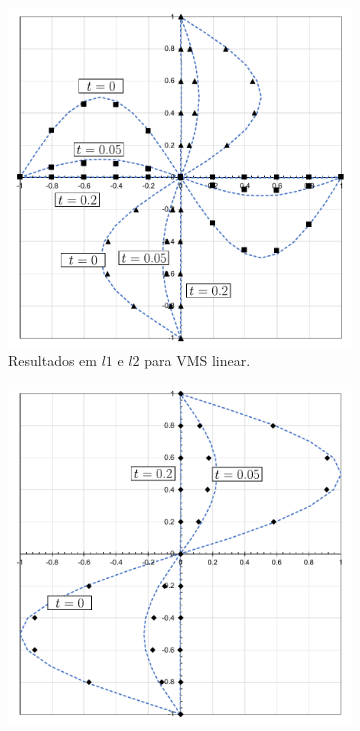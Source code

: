 \begin{figure}[h]
    \centering
    \caption{Resultados obtidos para a simulação de TGV.}
    \begin{subfigure}{0.42\textwidth}
    \includegraphics[width=\linewidth]{Figuras/taylor-green/VMS-Lin.pdf}
    \caption{Resultados em $l1$ e $l2$ para VMS linear.}
    \end{subfigure}
    \begin{subfigure}{0.42\textwidth}
    \includegraphics[width=\linewidth]{Figuras/taylor-green/VMS-Lin-uz.pdf}

\end{subfigure}
\end{figure}
